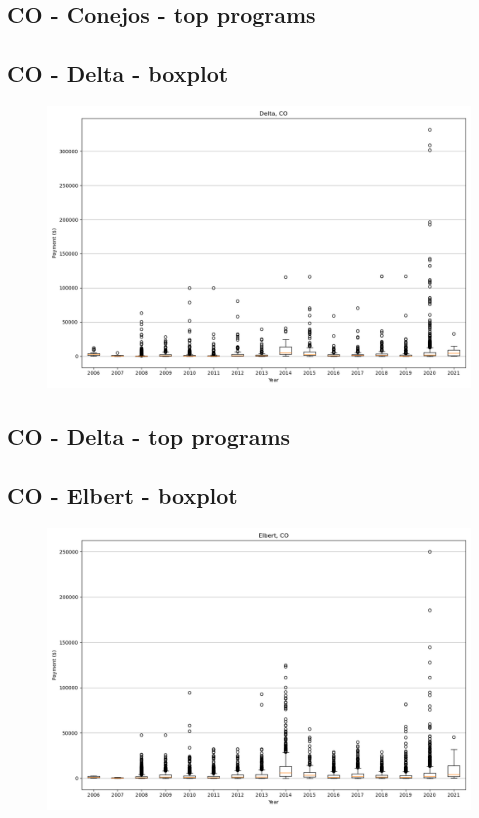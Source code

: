 \subsection*{CO - Conejos - top programs}

\newpage
\subsection*{CO - Delta - boxplot}
\begin{figure}[h]
\centering
\includegraphics[width=7in]{../output/boxplots/counties/Delta-CO_boxplot.png}
\end{figure}


\subsection*{CO - Delta - top programs}

\newpage
\subsection*{CO - Elbert - boxplot}
\begin{figure}[h]
\centering
\includegraphics[width=7in]{../output/boxplots/counties/Elbert-CO_boxplot.png}
\end{figure}


